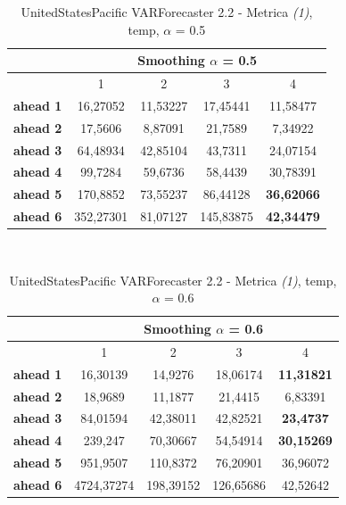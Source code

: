 \documentclass[12pt,a4paper,oneside,openright]{book}
\begin{document}
\medskip

\begin{table}[H]
\centering
\begin{tabular}{|c|c|c|c|c|}
\hline
 & \multicolumn{4}{|c|}{Smoothing $\alpha$ = 0.5} \\
\hline
& 1 & 2 & 3 & 4 \\
\hline
\textbf{ahead 1} & 16,27052 & 11,53227 & 17,45441 & 11,58477 \\
\hline
\textbf{ahead 2} & 17,5606 & 8,87091 & 21,7589 & 7,34922\\ 
\hline
\textbf{ahead 3} & 64,48934 & 42,85104 & 43,7311 & 24,07154 \\
\hline
\textbf{ahead 4} & 99,7284 & 59,6736 & 58,4439 & 30,78391\\ 
\hline
\textbf{ahead 5} & 170,8852 & 73,55237 & 86,44128 & \textbf{36,62066}\\
\hline
\textbf{ahead 6} & 352,27301 & 81,07127 & 145,83875 & \textbf{42,34479}\\ 
\hline
\end{tabular} \\
\caption{UnitedStatesPacific VARForecaster 2.2 - Metrica \textit{(1)}, temp, $\alpha$ = 0.5}
\end{table} 

\medskip

\begin{table}[H]
\centering
\begin{tabular}{|c|c|c|c|c|}
\hline
 & \multicolumn{4}{|c|}{Smoothing $\alpha$ = 0.6} \\
\hline
& 1 & 2 & 3 & 4 \\
\hline
\textbf{ahead 1} & 16,30139 & 14,9276 & 18,06174 & \textbf{11,31821} \\
\hline
\textbf{ahead 2} & 18,9689 & 11,1877 & 21,4415 & 6,83391\\ 
\hline
\textbf{ahead 3} & 84,01594 & 42,38011 & 42,82521 & \textbf{23,4737}\\
\hline
\textbf{ahead 4} & 239,247 & 70,30667 & 54,54914 & \textbf{30,15269}\\ 
\hline
\textbf{ahead 5} & 951,9507 & 110,8372 & 76,20901 & 36,96072\\
\hline
\textbf{ahead 6} & 4724,37274 & 198,39152 & 126,65686 & 42,52642\\ 
\hline
\end{tabular} \\
\caption{UnitedStatesPacific VARForecaster 2.2 - Metrica \textit{(1)}, temp, $\alpha$ = 0.6}
\end{table} 
\end{document}
